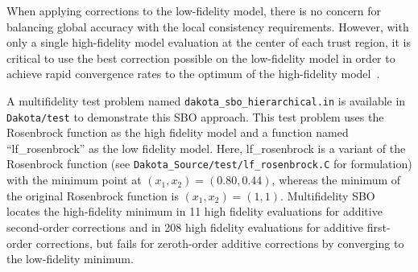 When applying corrections to the low-fidelity model, there is no
concern for balancing global accuracy with the local consistency
requirements.  However, with only a single high-fidelity model evaluation
at the center of each trust region, it is critical to use the best
correction possible on the low-fidelity model in order to achieve
rapid convergence rates to the optimum of the high-fidelity
model~\cite{Eld04}.


A multifidelity test problem named
\texttt{dakota\_sbo\_hierarchical.in} is available in
\texttt{Dakota/test} to demonstrate this SBO approach. This test
problem uses the Rosenbrock function as the high fidelity model and a
function named ``lf\_rosenbrock'' as the low fidelity model. Here,
lf\_rosenbrock is a variant of the Rosenbrock function (see
\texttt{Dakota\_Source/test/lf\_rosenbrock.C} for formulation) with the
minimum point at $(x_1,x_2)=(0.80,0.44)$, whereas the minimum of the
original Rosenbrock function is $(x_1,x_2)=(1,1)$. Multifidelity SBO
locates the high-fidelity minimum in 11 high fidelity evaluations for
additive second-order corrections and in 208 high fidelity evaluations
for additive first-order corrections, but fails for zeroth-order
additive corrections by converging to the low-fidelity minimum.


